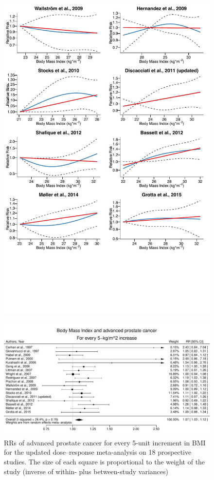 \begin{figure}[p]
\centering
\includegraphics[width=\linewidth]{figures/ss_adv2.pdf}
\end{figure}

\begin{figure}[p]
\centering
\includegraphics[width=\linewidth]{figures/fp_adv.pdf}
\caption[Forest plot for the association between BMI and incidence of advanced prostate cancer]{RRs of advanced prostate cancer for every 5-unit increment in BMI for the updated dose--response meta-analysis on 18 prospective studies. The size of each square is proportional to the weight of the study (inverse of within- plus between-study variances)}
\label{fig:fp_adv}
\end{figure}

